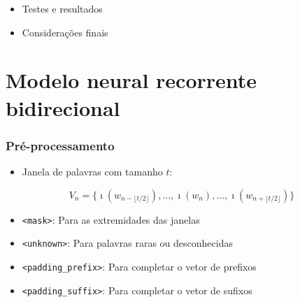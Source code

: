 \documentclass[10pt]{beamer}
\begin{document}
\begin{frame}
\begin{itemize}
    \color{gray}
    \item[\color{gray}{$\bullet$}] Testes e resultados

    \item[\color{gray}{$\bullet$}] Considerações finais

  \end{itemize}

\end{frame}


\section{Modelo neural recorrente bidirecional}

\begin{frame}[fragile]
\frametitle{Pré-processamento}


  \begin{itemize}
    \item Janela de palavras com tamanho $t$:
  \end{itemize}

  \begin{equation} \nonumber
    V_n = \big\{ \imath(w_{n - \lfloor t/2 \rfloor}), ..., \imath(w_n), ..., \imath(w_{n + \lfloor t/2 \rfloor}) \big\}
  \end{equation}

  \begin{itemize}
    \item \texttt{<mask>}: Para as extremidades das janelas
    \item \texttt{<unknown>}: Para palavras raras ou desconhecidas
    \item \texttt{<padding\_prefix>}: Para completar o vetor de prefixos
    \item \texttt{<padding\_suffix>}: Para completar o vetor de sufixos
  \end{itemize}

\end{frame}
\end{document}
